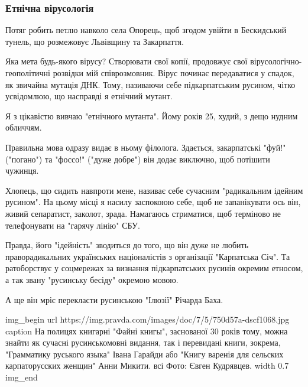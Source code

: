  
 
 

\subsubsection{Етнічна вірусологія}

Потяг робить петлю навколо села Опорець, щоб згодом увійти в Бескидський
тунель, що розмежовує Львівщину та Закарпаття.

\textemdash Яка мета будь-якого вірусу? Створювати свої копії, \textemdash продовжує свої
вірусологічно-геополітичні розвідки мій співрозмовник. \textemdash Вірус починає
передаватися у спадок, як звичайна мутація ДНК. Тому, називаючи себе
підкарпатським русином, чітко усвідомлюю, що насправді я етнічний мутант.

Я з цікавістю вивчаю "етнічного мутанта". Йому років 25, худий, з дещо нудним
обличчям.

Правильна мова одразу видає в ньому філолога. Здається, закарпатські "фуй!"
("погано") та "фоссо!" ("дуже добре") він додає виключно, щоб потішити чужинця.

Хлопець, що сидить навпроти мене, називає себе сучасним "радикальним ідейним
русином". На цьому місці я насилу заспокоюю себе, щоб не запанікувати \textemdash ось
він, живий сепаратист, заколот, зрада. Намагаюсь стриматися, щоб терміново не
телефонувати на "гарячу лінію" СБУ. 

Правда, його "ідейність" зводиться до того, що він дуже не любить
праворадикальних українських націоналістів з організації "Карпатська Січ". Та
ратоборствує у соцмережах за визнання підкарпатських русинів окремим етносом, а
так звану "русинську бесіду" \textemdash окремою мовою.

А ще він мріє перекласти русинською "Ілюзії" Річарда Баха.

\ifcmt
img_begin 
    url https://img.pravda.com/images/doc/7/5/750d57a-dscf1068.jpg
    caption На полицях книгарні "Файні книгы", заснованої 30 років тому, можна знайти як сучасні русинськомовні видання, так і перевидані книги, зокрема, "Грамматику руського языка" Івана Гарайди або "Книгу варенія для сельских карпаторусских женщин" Анни Микити. всі Фото: Євген Кудрявцев.
    width 0.7
img_end
\fi


